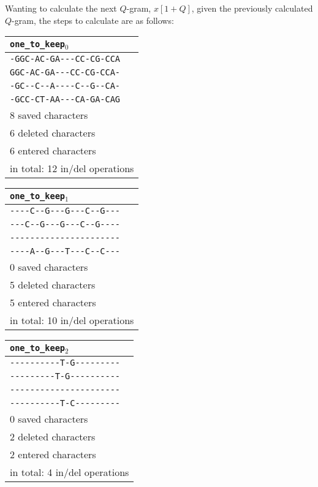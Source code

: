 \begin{example}
	Wanting to calculate the next $Q$-gram, $x[1 + Q]$, given the previously calculated $Q$-gram, the steps to calculate are as follows:
	\begin{center}
		\begin{tabular}{l}
			\verb|one_to_keep|$_0$\\
			\toprule
			\verb|-GGC-AC-GA---CC-CG-CCA| \\
			\verb|GGC-AC-GA---CC-CG-CCA-| \\
			\verb|-GC--C--A----C--G--CA-| \\
			\verb|-GCC-CT-AA---CA-GA-CAG| \\
			\midrule
			8 saved characters \\
			6 deleted characters \\
			6 entered characters \\
			\midrule
			in total: 12 in/del operations \\
		\end{tabular}
		\hspace{\fill}
		\begin{tabular}{l}
			\verb|one_to_keep|$_1$\\
			\toprule
			\verb|----C--G---G---C--G---| \\
			\verb|---C--G---G---C--G----| \\
			\verb|----------------------| \\
			\verb|----A--G---T---C--C---| \\
			\midrule
			0 saved characters \\
			5 deleted characters \\
			5 entered characters \\
			\midrule
			in total: 10 in/del operations \\
		\end{tabular}
	\end{center}
	
	\begin{center}
		\begin{tabular}{l}
			\verb|one_to_keep|$_2$\\
			\toprule
			\verb|----------T-G---------| \\
			\verb|---------T-G----------| \\
			\verb|----------------------| \\
			\verb|----------T-C---------| \\
			\midrule
			0 saved characters \\
			2 deleted characters \\
			2 entered characters \\
			\midrule
			in total: 4 in/del operations \\
		\end{tabular}
	\end{center}
	

\end{example}
